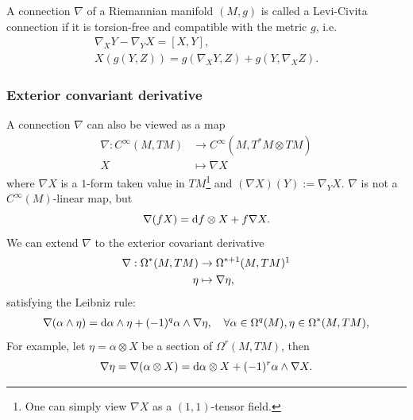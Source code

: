 \begin{definition}
    A connection $\nabla$ of a Riemannian manifold $(M,g)$ is called a Levi-Civita connection 
    if it is torsion-free and compatible with the metric $g$, i.e. 
    \begin{gather*}
        \nabla_X Y - \nabla_Y X = [X,Y], \\
        X(g(Y,Z)) = g(\nabla_X Y, Z) + g(Y, \nabla_X Z).
    \end{gather*}
\end{definition}

\subsubsection{Exterior convariant derivative}
A connection $\nabla$ can also be viewed as a map
\begin{align*}
    \nabla: C^\infty(M,TM) &\to C^\infty(M,T^*M \otimes TM) \\
    X &\mapsto \nabla X
\end{align*}
where $\nabla X$ is a $1$-form taken value in $TM$\footnote{One can simply view $\nabla X$ as a $(1,1)$-tensor field.} 
and $(\nabla X)(Y) := \nabla_Y X$.
$\nabla$ is not a $C^\infty(M)$-linear map, but 
\begin{equation*}
    \nabla(fX) = {\rm d} f \otimes X + f \nabla X.
\end{equation*}
We can extend $\nabla$ to the exterior covariant derivative 
\begin{align*}
    \nabla: \Omega^*(M,TM) &\to \Omega^{*+1}(M,TM) \footnotemark \\
    \eta &\mapsto \nabla \eta,
\end{align*}
satisfying the Leibniz rule:
\begin{align*}
    \nabla(\alpha\wedge\eta) = {\rm d}\alpha\wedge\eta + (-1)^{q}\alpha\wedge \nabla\eta,
    \quad\forall \alpha\in \Omega^q(M),\eta\in \Omega^*(M,TM),
\end{align*}
For example, let $\eta=\alpha\otimes X$ be a section of $\Omega^r(M,TM)$, then
\begin{equation*}
    \nabla \eta = \nabla(\alpha\otimes X) = {\rm d}\alpha \otimes X + (-1)^r \alpha\wedge \nabla X.
\end{equation*}

